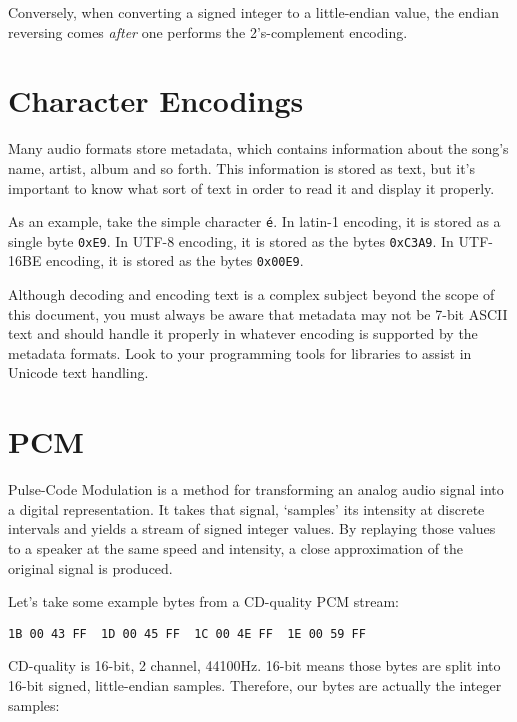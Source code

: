 Conversely, when converting a signed integer to a little-endian value,
the endian reversing comes \textit{after} one performs the
2's-complement encoding.

\section{Character Encodings}

Many audio formats store metadata, which contains information about
the song's name, artist, album and so forth.
This information is stored as text, but it's important to know what
sort of text in order to read it and display it properly.

As an example, take the simple character \texttt{\'e}.
In latin-1 encoding, it is stored as a single byte \texttt{0xE9}.
In UTF-8 encoding, it is stored as the bytes \texttt{0xC3A9}.
In UTF-16BE encoding, it is stored as the bytes \texttt{0x00E9}.

Although decoding and encoding text is a complex subject beyond
the scope of this document, you must always be aware that
metadata may not be 7-bit ASCII text and should handle
it properly in whatever encoding is supported by the metadata
formats.
Look to your programming tools for libraries to assist in Unicode
text handling.

\pagebreak

\section {PCM}

Pulse-Code Modulation is a method for transforming an analog
audio signal into a digital representation.
It takes that signal, `samples' its intensity at
discrete intervals and yields a stream of signed integer
values.
By replaying those values to a speaker at the same
speed and intensity, a close approximation of the
original signal is produced.

Let's take some example bytes from a CD-quality PCM stream:

\begin{Verbatim}[frame=single]
1B 00 43 FF  1D 00 45 FF  1C 00 4E FF  1E 00 59 FF
\end{Verbatim}

CD-quality is 16-bit, 2 channel, 44100Hz.
16-bit means those bytes are split into 16-bit signed, little-endian samples.
Therefore, our bytes are actually the integer samples:


